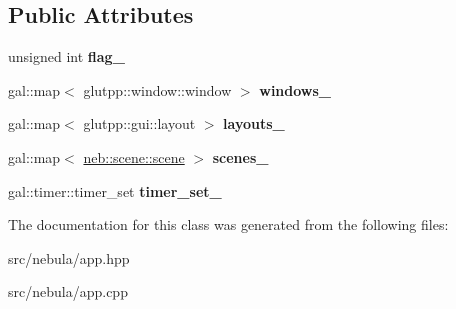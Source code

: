 \subsection*{Public Attributes}
\begin{DoxyCompactItemize}
\item 
\hypertarget{classneb_1_1app_a541f268dba5963578a9a7985db8ab465}{
unsigned int {\bfseries flag\_\-}}
\label{classneb_1_1app_a541f268dba5963578a9a7985db8ab465}

\item 
\hypertarget{classneb_1_1app_ad6b61ebea17df0281aa2f9e0caa7f675}{
gal::map$<$ glutpp::window::window $>$ {\bfseries windows\_\-}}
\label{classneb_1_1app_ad6b61ebea17df0281aa2f9e0caa7f675}

\item 
\hypertarget{classneb_1_1app_a5e83d509c862b9050e3840a7fe15ac01}{
gal::map$<$ glutpp::gui::layout $>$ {\bfseries layouts\_\-}}
\label{classneb_1_1app_a5e83d509c862b9050e3840a7fe15ac01}

\item 
\hypertarget{classneb_1_1app_ac53edb0e3764d01881d544bf27106a89}{
gal::map$<$ \hyperlink{classneb_1_1scene_1_1scene}{neb::scene::scene} $>$ {\bfseries scenes\_\-}}
\label{classneb_1_1app_ac53edb0e3764d01881d544bf27106a89}

\item 
\hypertarget{classneb_1_1app_a23c6f2ed724892216392a4607606f9ed}{
gal::timer::timer\_\-set {\bfseries timer\_\-set\_\-}}
\label{classneb_1_1app_a23c6f2ed724892216392a4607606f9ed}

\end{DoxyCompactItemize}


The documentation for this class was generated from the following files:\begin{DoxyCompactItemize}
\item 
src/nebula/app.hpp\item 
src/nebula/app.cpp\end{DoxyCompactItemize}
